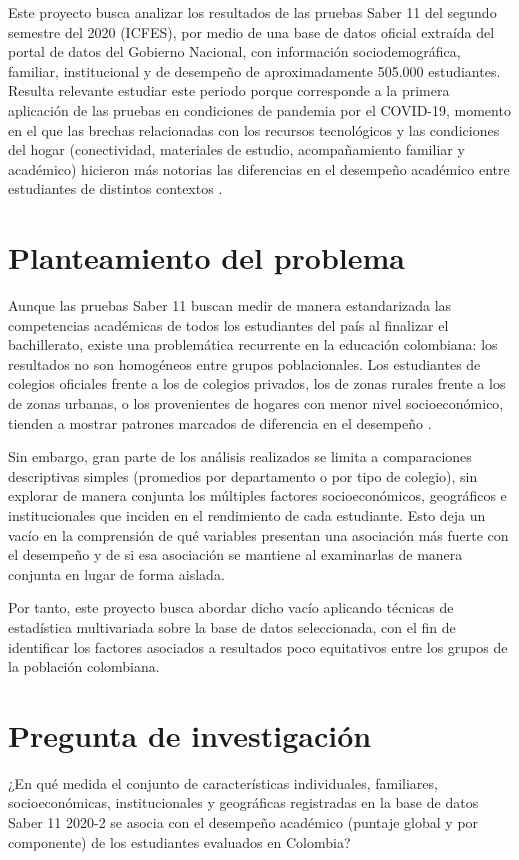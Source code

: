 \documentclass[12pt]{article}
\newcommand{\corr}[1]{\textcolor{azulcorr}{#1}}
\begin{document}
Este proyecto busca analizar los resultados de las pruebas Saber 11 del segundo semestre del
2020 (ICFES), por medio de una base de datos oficial extraída del portal de datos del
Gobierno Nacional, con información sociodemográfica, familiar, institucional y de desempeño de
aproximadamente 505.000 estudiantes. Resulta relevante estudiar este periodo porque corresponde a la primera aplicación
de las pruebas en condiciones de pandemia por el COVID-19, momento en el que las brechas relacionadas con los recursos
tecnológicos y las condiciones del hogar (conectividad, materiales de estudio, acompañamiento familiar y académico)
hicieron más notorias las diferencias en el desempeño académico entre estudiantes de distintos contextos \corr{\parencite{quintero2025}}.

\section{Planteamiento del problema}

Aunque las pruebas Saber 11 buscan medir de manera estandarizada las
competencias académicas de todos los estudiantes del país al finalizar el bachillerato,
existe una problemática recurrente en la educación colombiana: los resultados no
son homogéneos entre grupos poblacionales. Los estudiantes de colegios
oficiales frente a los de colegios privados, los de zonas rurales frente a los de
zonas urbanas, o los provenientes de hogares con menor nivel socioeconómico, tienden
a mostrar patrones marcados de diferencia en el desempeño \parencite{morales2024}.

Sin embargo, gran parte de los análisis realizados se limita a comparaciones descriptivas simples
(promedios por departamento o por tipo de colegio), sin explorar de manera conjunta los múltiples
factores socioeconómicos, geográficos e institucionales que inciden en el rendimiento de cada estudiante. Esto deja un vacío en
la comprensión de \corr{qué variables presentan una asociación más fuerte con el desempeño
y de si esa asociación se mantiene al examinarlas de manera conjunta} en lugar de forma aislada.

Por tanto, este proyecto busca abordar dicho vacío aplicando técnicas de estadística multivariada sobre
la base de datos seleccionada, con el fin de identificar los factores asociados a \corr{resultados}
poco equitativos entre los grupos de la población colombiana.

\section{Pregunta de investigación}
¿En qué medida el conjunto de características individuales, familiares, socioeconómicas,
institucionales y geográficas registradas en la base de datos Saber 11 2020-2 se
asocia con el desempeño académico (puntaje global y por componente) de los estudiantes
evaluados en Colombia?
\end{document}
